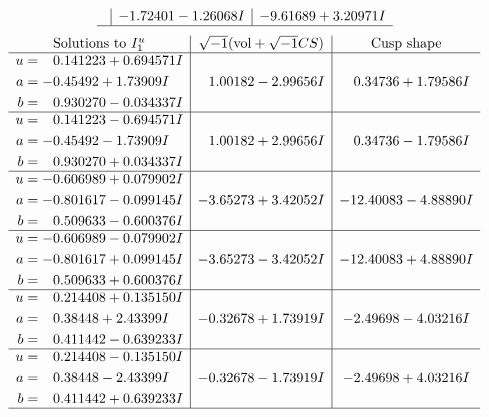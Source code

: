 \documentclass[1p]{elsarticle_modified}
\theoremstyle{definition}
\newcommand{\I}{\sqrt{-1}}
\begin{document}
$$\begin{array}{c|c|c}
 & -1.72401 - 1.26068 I & -9.61689 + 3.20971 I\\
 \hline 
 \end{array}$$\newpage$$\begin{array}{c|c|c}  
\text{Solutions to }I^u_{1}& \I (\text{vol} + \sqrt{-1}CS) & \text{Cusp shape}\\
 \hline 
\begin{aligned}
u &= \phantom{-}0.141223 + 0.694571 I \\
a &= -0.45492 + 1.73909 I \\
b &= \phantom{-}0.930270 - 0.034337 I\end{aligned}
 & \phantom{-}1.00182 - 2.99656 I & \phantom{-}0.34736 + 1.79586 I \\ \hline\begin{aligned}
u &= \phantom{-}0.141223 - 0.694571 I \\
a &= -0.45492 - 1.73909 I \\
b &= \phantom{-}0.930270 + 0.034337 I\end{aligned}
 & \phantom{-}1.00182 + 2.99656 I & \phantom{-}0.34736 - 1.79586 I \\ \hline\begin{aligned}
u &= -0.606989 + 0.079902 I \\
a &= -0.801617 - 0.099145 I \\
b &= \phantom{-}0.509633 - 0.600376 I\end{aligned}
 & -3.65273 + 3.42052 I & -12.40083 - 4.88890 I \\ \hline\begin{aligned}
u &= -0.606989 - 0.079902 I \\
a &= -0.801617 + 0.099145 I \\
b &= \phantom{-}0.509633 + 0.600376 I\end{aligned}
 & -3.65273 - 3.42052 I & -12.40083 + 4.88890 I \\ \hline\begin{aligned}
u &= \phantom{-}0.214408 + 0.135150 I \\
a &= \phantom{-}0.38448 + 2.43399 I \\
b &= \phantom{-}0.411442 - 0.639233 I\end{aligned}
 & -0.32678 + 1.73919 I & -2.49698 - 4.03216 I \\ \hline\begin{aligned}
u &= \phantom{-}0.214408 - 0.135150 I \\
a &= \phantom{-}0.38448 - 2.43399 I \\
b &= \phantom{-}0.411442 + 0.639233 I\end{aligned}
 & -0.32678 - 1.73919 I & -2.49698 + 4.03216 I\\
 \hline 
 \end{array}$$\newpage\newpage\renewcommand{\arraystretch}{1}
\end{document}
